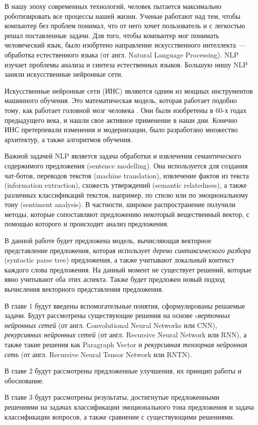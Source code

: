 \startprefacepage
В нашу эпоху современных технологий, человек пытается максимально
роботизировать все процессы нашей жизни. Ученые работают над тем,
чтобы компьютер без проблем понимал, что от него хочет пользователь и с легкостью
решал поставленные задачи. 
Для того, чтобы компьютер мог понимать человеческий язык, было изобртено направление искусственного интеллекта~--- обработка естественного языка (от англ. Natural Language Processing). 
NLP изучает проблемы анализа и синтеза естественных языков\cite{wikinlp}.
Большую нишу NLP заняли искусственные нейронные сети.

Искусственные нейронные сети (ИНС) являются одним из мощных инструментов машинного
обучения.
Это математическая модель, которая работает подобно тому, как работает головной
мозг человека \cite{rosenblatt58a}.
Они были изобретены в 60-х годах предыдущего века, и нашли свое активное
применение в наши дни. Конечно ИНС претерпевали изменения и модернизации, было разработано множество архитектур, а также алгоритмов обучения\cite{Duchi2011, zeiler2012, rprop93}.

Важной задачей NLP является задача  обработки и 
извлечения семантического содержимого предложения (sentence modelling).
Она используется для создания чат-ботов, переводов текстов (machine translation), 
извлечение фактов из текста (information extraction), схожесть утверждений (semantic relatedness), 
а также различных классификаций текстов, например, по стилю или по эмоциональному тону (sentiment analysis).
В частности, широкое распространение получили методы, 
которые сопоставляют предложению некоторый вещественный вектор, 
с помощью которого и происходит анализ предложения.

В данной работе будет предложена модель, вычисляющая векторное представление предложения, 
которая использует \emph{дерево синтаксического разбора} (syntactic parse tree) предложения, а также учитывают локальный контекст каждого слова предложения.
На данный момент не существует решений, которые явно учитывают оба этих аспекта.
Также будет предложен новый подход вычисления векторного представления предложения.

В главе 1 будут введены вспомогательные понятия, сформулированы решаемые задачи.
Будут рассмотрены существующие решения на основе \emph{cверточных нейронных сетей} (от англ. Сonvolutional Neural Networks или CNN), \emph{рекурсивных нейронных сетей} (от англ. Recursive Neural Network или RNN), а также такие решения как Paragraph Vector и \emph{рекурсивная тензорная нейронная сеть} (от англ. Recursive Neural Tensor Network или RNTN).

В главе 2 будут рассмотрены предложенные улучшения, их принцип работы и обоснование.

В главе 3 будут рассмотрены результаты, достигнутые предложенными решениями на задачах классификации
эмоционального тона предложения и задача классификации вопросов, а также сравнение с существующими решениями.